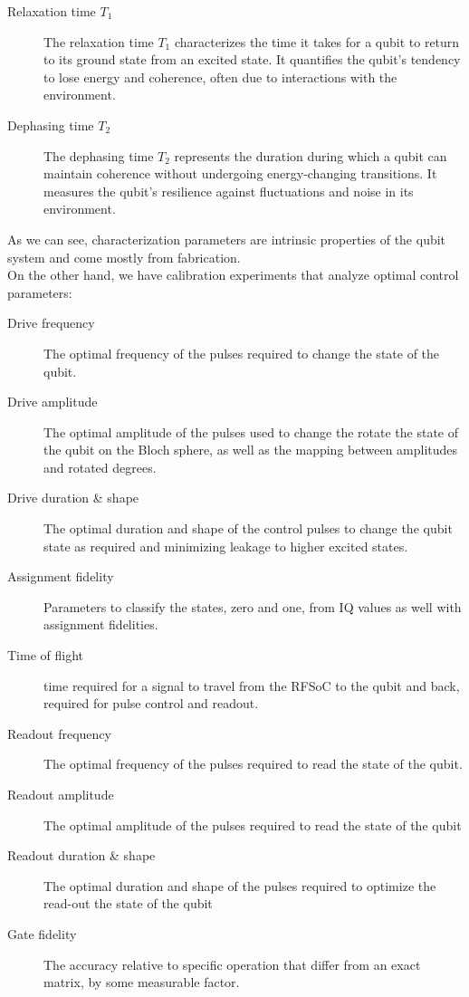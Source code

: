 \begin{description}
    \item[Relaxation time $T_1$] The relaxation time $T_1$ characterizes the time it takes for a qubit to return to its ground state from an excited state. It quantifies the qubit's tendency to lose energy and coherence, often due to interactions with the environment.
    \item[Dephasing time $T_2$] The dephasing time $T_2$ represents the duration during which a qubit can maintain coherence without undergoing energy-changing transitions. It measures the qubit's resilience against fluctuations and noise in its environment.
\end{description}

As we can see, characterization parameters are intrinsic properties of the qubit system and come mostly from fabrication.\\
On the other hand, we have calibration experiments that analyze optimal control parameters:

\begin{description}
    \item[Drive frequency] The optimal frequency of the pulses required to change the state of the qubit.
    \item[Drive amplitude] The optimal amplitude of the pulses used to change the rotate the state of the qubit on the Bloch sphere, as well as the mapping between amplitudes and rotated degrees.
    \item[Drive duration \& shape] The optimal duration and shape of the control pulses to change the qubit state as required and minimizing leakage to higher excited states.
    \item[Assignment fidelity] Parameters to classify the states, zero and one, from IQ values as well with assignment fidelities.
    \item[Time of flight] time required for a signal to travel from the RFSoC to the qubit and back, required for pulse control and readout.
    \item[Readout frequency] The optimal frequency of the pulses required to read the state of the qubit.
    \item[Readout amplitude] The optimal amplitude of the pulses required to read the state of the qubit
    \item[Readout duration \& shape] The optimal duration and shape of the pulses required to optimize the read-out the state of the qubit
    \item[Gate fidelity] The accuracy relative to specific operation that differ from an exact matrix, by some measurable factor.
\end{description}

